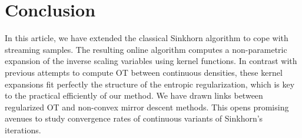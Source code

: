 
\section{Conclusion}

In this article, we have extended the classical Sinkhorn algorithm to cope with streaming samples. The resulting online algorithm computes a non-parametric expansion of the inverse scaling variables using kernel functions. In contrast with previous attempts to compute OT between continuous densities, these kernel expansions fit perfectly the structure of the entropic regularization, which is key to the practical efficiently of our method. 
%
We have drawn links between regularized OT and non-convex mirror descent methods. This opens promising avenues to study convergence rates of continuous variants of Sinkhorn's iterations.